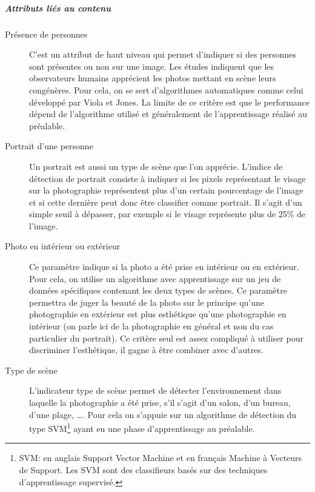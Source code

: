 \documentclass[11pt, french,screen]{report-rd-info}
\begin{document}
\subparagraph{Attributs liés au contenu}
\begin{description}
\item[Présence de personnes]
C’est un attribut de haut niveau qui permet d’indiquer si des personnes sont présentes ou non sur une image. Les études indiquent que les observateurs humains apprécient les photos mettant en scène leurs congénères. Pour cela, on se sert d’algorithmes automatiques comme celui développé par Viola et Jones. La limite de ce critère est que le performance dépend de l’algorithme utilisé et généralement de l’apprentissage réalisé au préalable.
\item[Portrait d'une personne]
Un portrait est aussi un type de scène que l’on apprécie. L’indice de détection de portrait consiste à indiquer si les pixels représentant le visage sur la photographie représentent plus d’un certain pourcentage de l’image et si cette dernière peut donc être classifier comme portrait. Il s’agit d’un simple seuil à dépasser, par exemple si le visage représente plus de 25\% de l’image.
\item[Photo en intérieur ou extérieur]
Ce paramètre indique si la photo a été prise en intérieur ou en extérieur. Pour cela, on utilise un algorithme avec apprentissage sur un jeu de données spécifiques contenant les deux types de scènes. Ce paramètre permettra de juger la beauté de la photo sur le principe qu’une photographie en extérieur est plus esthétique qu’une photographie en intérieur (on parle ici de la photographie en général et non du cas particulier du portrait). Ce critère seul est assez compliqué à utiliser pour discriminer l’esthétique, il gagne à être combiner avec d’autres.
\item[Type de scène]
L’indicateur type de scène permet de détecter l’environnement dans laquelle la photographie a été prise, s’il s’agit d’un salon, d’un bureau, d’une plage, \ldots. Pour cela on s’appuie sur un algorithme de détection du type SVM\footnote{SVM: en anglais Support Vector Machine et en français Machine à Vecteurs de Support. Les SVM sont des classifieurs basés sur des techniques d'apprentissage supervisé.} ayant eu une phase d’apprentissage au préalable.
\end{description}
\end{document}
